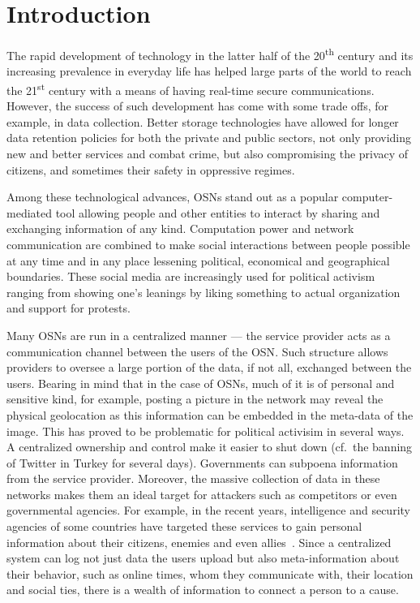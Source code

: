 \section{Introduction}
\label{Introduction}
The rapid development of technology in the latter half of the
20\textsuperscript{th} century and its increasing prevalence in
everyday life has helped large parts of the world to reach the
21\textsuperscript{st} century with a means of having real-time secure
communications.  However, the success of such development has come
with some trade offs, for example, in data collection. Better storage
technologies have allowed for longer data retention policies for both
the private and public sectors, not only providing new and better
services and combat crime, but also compromising the privacy of
citizens, and sometimes their safety in oppressive regimes.

Among these technological advances, \acp{OSN} stand out as a popular
computer-mediated tool allowing people and other entities to interact
by sharing and exchanging information of any kind. Computation power
and network communication are combined to make social interactions
between people possible at any time and in any place lessening
political, economical and geographical boundaries. These social media
are increasingly used for political activism ranging from showing
one's leanings by liking something to actual organization and support for
protests.

Many \acp{OSN} are run in a centralized manner --- the service
provider acts as a communication channel between the users of the
\ac{OSN}. Such structure allows providers to oversee a large portion
of the data, if not all, exchanged between the users. Bearing in mind
that in the case of \acp{OSN}, much of it is of personal and sensitive
kind, for example, posting a picture in the network may reveal the
physical geolocation as this information can be embedded in the
meta-data of the image. This has proved to be problematic for
political activisim in several ways. A centralized ownership and
control make it easier to shut down (cf.\ the banning of Twitter in
Turkey for several days). Governments can subpoena 
information from the service provider.  Moreover, the massive
collection of data in these networks makes them an ideal target for
attackers such as competitors or even governmental agencies. For
example, in the recent years, intelligence and security agencies of
some countries have targeted these services to gain personal
information about their citizens, enemies and even
allies~\cite{Prism}. Since a centralized system can log not just data
the users upload but also meta-information about their behavior, such
as online times, whom they communicate with, their location and social
ties, there is a wealth of information to connect a person to a cause.

